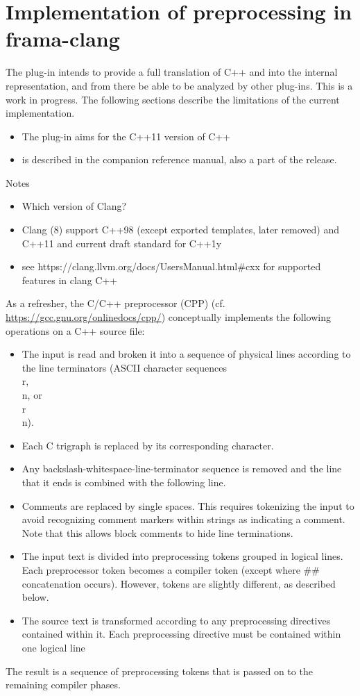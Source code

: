 \section{Implementation of preprocessing in frama-clang}
\label{sec:ppimpl}

The \fclang plug-in intends to provide a full translation of C++ and \NAME into the \framac internal representation, and from there be able to be analyzed by other \framac plug-ins. This is a work in progress. The following sections describe the  limitations of the current implementation.
\begin{itemize}
	\item The plug-in aims for the C++11 version of C++
	\item \NAME is described in the companion \NAME reference manual, also a part of the \framac release.
\end{itemize}


Notes
\begin{itemize}
	\item Which version of Clang?
	\item Clang (8) support C++98 (except exported templates, later removed) and C++11 and current draft standard for C++1y 
	\item see https://clang.llvm.org/docs/UsersManual.html\#cxx for supported features in clang C++
\end{itemize}


As a refresher, the C/C++ preprocessor (CPP) (cf. \url{https://gcc.gnu.org/onlinedocs/cpp/}) conceptually implements the following operations on a C++ source file:
\begin{itemize}
	\item The input is read and broken it into a sequence of physical lines according to the line terminators (ASCII character sequences \\r, \\n, or \\r\\n).
	\item Each C trigraph is replaced by its corresponding character.
	\item Any backslash-whitespace-line-terminator sequence is removed and the line that it ends is combined with the following line.
	\item Comments are replaced by single spaces. This requires tokenizing the input to avoid recognizing comment markers within strings as indicating a comment. Note that this allows block comments to hide line terminations.
	\item The input text is divided into preprocessing tokens grouped in logical lines. Each preprocessor token becomes a compiler token (except where \#\# concatenation occurs). However, \acslb tokens are slightly different, as described below.
	\item The source text is transformed according to any preprocessing directives contained within it. Each preprocessing directive must be contained within one logical line
	
\end{itemize}
The result is a sequence of preprocessing tokens that is passed on to the 
remaining compiler phases.

